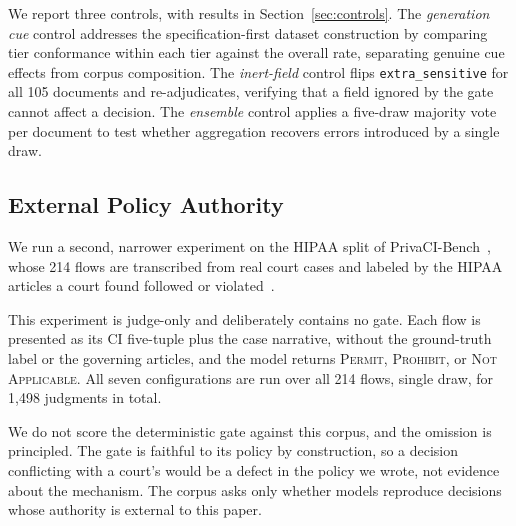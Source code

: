 We report three controls, with results in Section~\ref{sec:controls}. The \textit{generation cue} control addresses the specification-first dataset construction by comparing tier conformance within each tier against the overall rate, separating genuine cue effects from corpus composition. The \textit{inert-field} control flips \texttt{extra\_sensitive} for all 105 documents and re-adjudicates, verifying that a field ignored by the gate cannot affect a decision. The \textit{ensemble} control applies a five-draw majority vote per document to test whether aggregation recovers errors introduced by a single draw.



\subsection{External Policy Authority}
\label{sec:privaci}
We run a second, narrower experiment on the HIPAA split of
PrivaCI-Bench~\cite{privacibench}, whose 214 flows are transcribed from real
court cases and labeled by the HIPAA articles a court found followed or
violated~\cite{goldcoin}.

This experiment is judge-only and deliberately contains no gate. Each flow is
presented as its CI five-tuple plus the case narrative, without the
ground-truth label or the governing articles, and the model returns
\textsc{Permit}, \textsc{Prohibit}, or \textsc{Not Applicable}. All seven
configurations are run over all 214 flows, single draw, for 1,498 judgments in
total.

We do not score the deterministic gate against this corpus, and the omission is
principled. The gate is faithful to its policy by construction, so a decision
conflicting with a court's would be a defect in the policy we wrote, not
evidence about the mechanism. The corpus asks only whether models reproduce
decisions whose authority is external to this paper.
